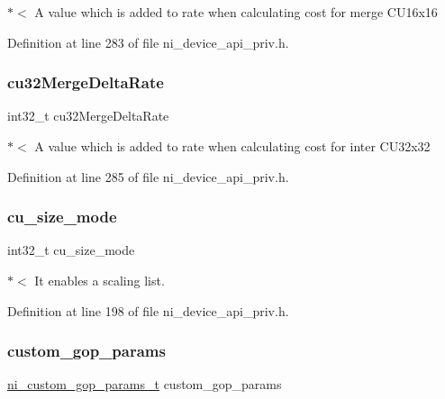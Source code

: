 $\ast$$<$ A value which is added to rate when calculating cost for merge C\+U16x16 

Definition at line 283 of file ni\+\_\+device\+\_\+api\+\_\+priv.\+h.

\mbox{\label{struct__ni__t408__config__t_aa143605a2c305b7e9279e09b4cf2df2c}} 
\subsubsection{\texorpdfstring{cu32MergeDeltaRate}{cu32MergeDeltaRate}}
{\footnotesize\ttfamily int32\+\_\+t cu32\+Merge\+Delta\+Rate}

$\ast$$<$ A value which is added to rate when calculating cost for inter C\+U32x32 

Definition at line 285 of file ni\+\_\+device\+\_\+api\+\_\+priv.\+h.

\mbox{\label{struct__ni__t408__config__t_af6b8481b13c45b02c51831e2b53dcfdf}} 
\subsubsection{\texorpdfstring{cu\_size\_mode}{cu\_size\_mode}}
{\footnotesize\ttfamily int32\+\_\+t cu\+\_\+size\+\_\+mode}

$\ast$$<$ It enables a scaling list. 

Definition at line 198 of file ni\+\_\+device\+\_\+api\+\_\+priv.\+h.

\mbox{\label{struct__ni__t408__config__t_a527c5bcdee05a1fe4ec5d8493aa5c795}} 
\subsubsection{\texorpdfstring{custom\_gop\_params}{custom\_gop\_params}}
{\footnotesize\ttfamily \mbox{\hyperlink{ni__device__api_8h_aa270bcddd5fd34880207abe21ac6ce31}{ni\+\_\+custom\+\_\+gop\+\_\+params\+\_\+t}} custom\+\_\+gop\+\_\+params}

